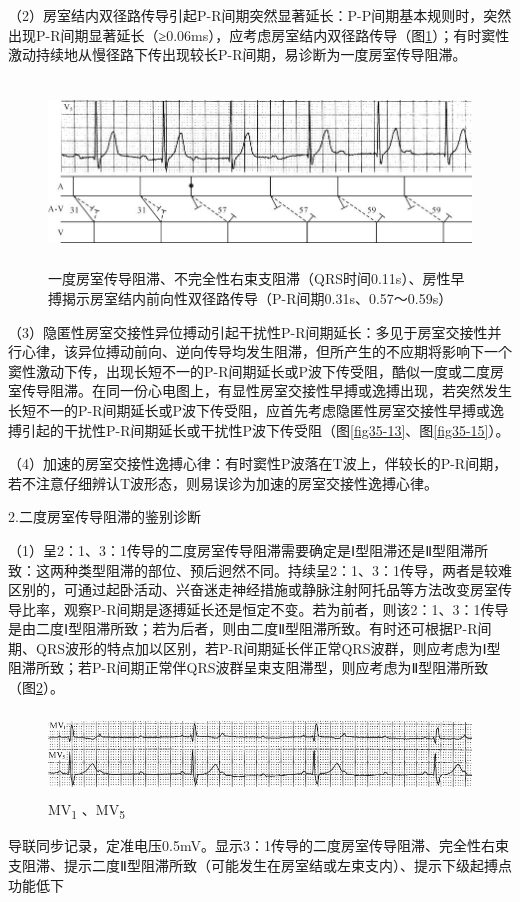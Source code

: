 （2）房室结内双径路传导引起P-R间期突然显著延长：P-P间期基本规则时，突然出现P-R间期显著延长（≥0.06ms），应考虑房室结内双径路传导（图\ref{fig20-14}）；有时窦性激动持续地从慢径路下传出现较长P-R间期，易诊断为一度房室传导阻滞。

\begin{figure}[!htbp]
 \centering
 \includegraphics[width=5.78125in,height=1.9375in]{./images/Image00343.jpg}
 \captionsetup{justification=centering}
 \caption{一度房室传导阻滞、不完全性右束支阻滞（QRS时间0.11s）、房性早搏揭示房室结内前向性双径路传导（P-R间期0.31s、0.57～0.59s）}
 \label{fig20-14}
  \end{figure} 

（3）隐匿性房室交接性异位搏动引起干扰性P-R间期延长：多见于房室交接性并行心律，该异位搏动前向、逆向传导均发生阻滞，但所产生的不应期将影响下一个窦性激动下传，出现长短不一的P-R间期延长或P波下传受阻，酷似一度或二度房室传导阻滞。在同一份心电图上，有显性房室交接性早搏或逸搏出现，若突然发生长短不一的P-R间期延长或P波下传受阻，应首先考虑隐匿性房室交接性早搏或逸搏引起的干扰性P-R间期延长或干扰性P波下传受阻（图\ref{fig35-13}、图\ref{fig35-15}）。

（4）加速的房室交接性逸搏心律：有时窦性P波落在T波上，伴较长的P-R间期，若不注意仔细辨认T波形态，则易误诊为加速的房室交接性逸搏心律。

2.二度房室传导阻滞的鉴别诊断

（1）呈2：1、3：1传导的二度房室传导阻滞需要确定是Ⅰ型阻滞还是Ⅱ型阻滞所致：这两种类型阻滞的部位、预后迥然不同。持续呈2：1、3：1传导，两者是较难区别的，可通过起卧活动、兴奋迷走神经措施或静脉注射阿托品等方法改变房室传导比率，观察P-R间期是逐搏延长还是恒定不变。若为前者，则该2：1、3：1传导是由二度Ⅰ型阻滞所致；若为后者，则由二度Ⅱ型阻滞所致。有时还可根据P-R间期、QRS波形的特点加以区别，若P-R间期延长伴正常QRS波群，则应考虑为Ⅰ型阻滞所致；若P-R间期正常伴QRS波群呈束支阻滞型，则应考虑为Ⅱ型阻滞所致（图\ref{fig20-15}）。

\begin{figure}[!htbp]
 \centering
 \includegraphics[width=5.58333in,height=0.875in]{./images/Image00344.jpg}
 \captionsetup{justification=centering}
 \caption{MV\textsubscript{1} 、MV\textsubscript{5}}
 \label{fig20-15}
  \end{figure} 
导联同步记录，定准电压0.5mV。显示3：1传导的二度房室传导阻滞、完全性右束支阻滞、提示二度Ⅱ型阻滞所致（可能发生在房室结或左束支内）、提示下级起搏点功能低下

